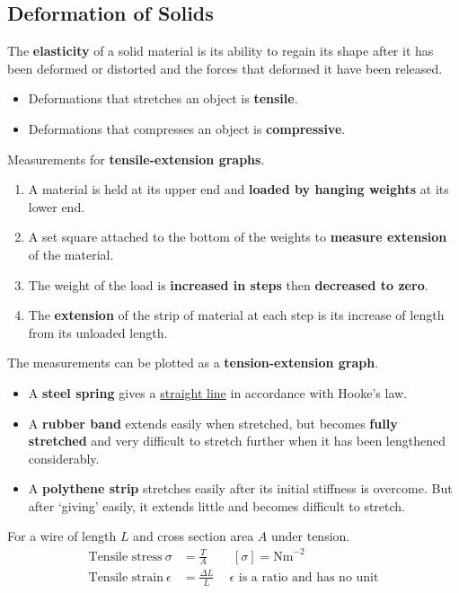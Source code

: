 \subsection{Deformation of Solids}

The \textbf{elasticity} of a solid material is its ability to regain its shape after it has been deformed or distorted and the forces that deformed it have been released.
\begin{itemize}
    \item Deformations that stretches an object is \textbf{tensile}.
    \item Deformations that compresses an object is \textbf{compressive}.
\end{itemize}

Measurements for \textbf{tensile-extension graphs}.
\begin{enumerate}
    \item A material is held at its upper end and \textbf{loaded by hanging weights} at its lower end.
    \item A set square attached to the bottom of the weights to \textbf{measure extension} of the material.
    \item The weight of the load is \textbf{increased in steps} then \textbf{decreased to zero}.
    \item The \textbf{extension} of the strip of material at each step is its increase of length from its unloaded length.
\end{enumerate}
The measurements can be plotted as a \textbf{tension-extension graph}.
\begin{itemize}
    \item A \textbf{steel spring} gives a \underline{straight line} in accordance with Hooke's law.
    \item A \textbf{rubber band} extends easily when stretched, but becomes \textbf{fully stretched} and very difficult to stretch further when it has been lengthened considerably.
    \item A \textbf{polythene strip} stretches easily after its initial stiffness is overcome. But after `giving' easily, it extends little and becomes difficult to stretch.
\end{itemize}

For a wire of length $L$ and cross section area $A$ under tension.
\begin{align*}
    \text{Tensile stress}\ \sigma&=\frac{T}{A}\qquad[\sigma]=\text{Nm}^{-2}\\
    \text{Tensile strain}\ \epsilon&=\frac{\Delta L}{L}\quad\ \text{$\epsilon$ is a ratio and has no unit}
\end{align*}

